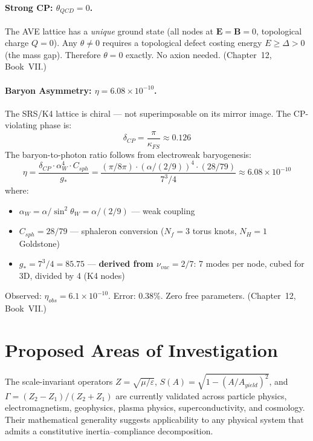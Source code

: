 \paragraph{Strong CP: $\theta_{QCD} = 0$.}
The AVE lattice has a \textit{unique} ground state (all nodes at
$\mathbf{E} = \mathbf{B} = 0$, topological charge $Q = 0$).  Any
$\theta \ne 0$ requires a topological defect costing energy
$E \ge \Delta > 0$ (the mass gap).  Therefore $\theta = 0$ exactly.
No axion needed.  (Chapter~12, Book~VII.)

\paragraph{Baryon Asymmetry: $\eta = 6.08 \times 10^{-10}$.}
The SRS/K4 lattice is chiral --- not superimposable on its mirror
image.  The CP-violating phase is:
\begin{equation}
    \delta_{CP} = \frac{\pi}{\kappa_{FS}} \approx 0.126
\end{equation}
The baryon-to-photon ratio follows from electroweak baryogenesis:
\begin{equation}
    \eta = \frac{\delta_{CP} \cdot \alpha_W^4 \cdot C_{sph}}{g_*}
    = \frac{(\pi/8\pi) \cdot (\alpha/(2/9))^4 \cdot (28/79)}{7^3/4}
    \approx 6.08 \times 10^{-10}
\end{equation}
where:
\begin{itemize}
    \item $\alpha_W = \alpha/\sin^2\theta_W = \alpha/(2/9)$ --- weak coupling
    \item $C_{sph} = 28/79$ --- sphaleron conversion ($N_f = 3$ torus knots,
          $N_H = 1$ Goldstone)
    \item $g_* = 7^3/4 = 85.75$ --- \textbf{derived from $\nu_{vac} = 2/7$}:
          7 modes per node, cubed for 3D, divided by 4 (K4 nodes)
\end{itemize}
Observed: $\eta_{obs} = 6.1 \times 10^{-10}$.  Error: 0.38\%.
Zero free parameters.  (Chapter~12, Book~VII.)


\section{Proposed Areas of Investigation}
\label{sec:proposed_investigations}

The scale-invariant operators $Z = \sqrt{\mu/\varepsilon}$,
$S(A) = \sqrt{1 - (A/A_{yield})^2}$, and
$\Gamma = (Z_2 - Z_1)/(Z_2 + Z_1)$ are currently validated across
particle physics, electromagnetism, geophysics, plasma physics,
superconductivity, and cosmology.  Their mathematical generality
suggests applicability to any physical system that admits a
constitutive inertia--compliance decomposition.

